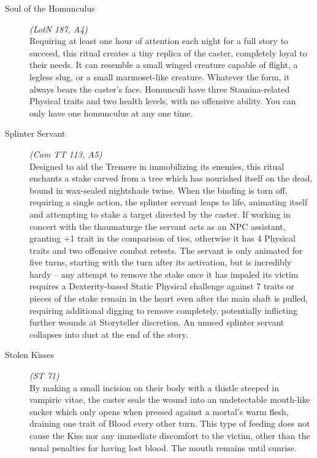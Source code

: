 \begin{description}
	\item[Soul of the Homunculus] \emph{(LotN 187, A4)} \hfill \\
	Requiring at least one hour of attention each night for a full story to succeed, this ritual creates a tiny replica of the caster, 
	completely loyal to their needs.  It can resemble a small winged creature capable of flight, a legless slug, or a small 
	marmoset-like creature.  Whatever the form, it always bears the caster's face.  Homunculi have three Stamina-related Physical 
	traits and two health levels, with no offensive ability.  You can only have one homunculus at any one time. \\

	\item[Splinter Servant] \emph{(Cam TT 113, A5)} \hfill \\
	Designed to aid the Tremere in immobilizing its enemies, this ritual enchants a stake carved from a tree which has nourished 
	itself on the dead, bound in wax-sealed nightshade twine.  When the binding is torn off, requiring a single action, the 
	splinter servant leaps to life, animating itself and attempting to stake a target directed by the caster.  If working in 
	concert with the thaumaturge the servant acts as an NPC assistant, granting +1 trait in the comparison of ties, otherwise it 
	has 4 Physical traits and two offensive combat retests.  The servant is only animated for five turns, starting with the turn 
	after its activation, but is incredibly hardy -- any attempt to remove the stake once it has impaled its victim requires a 
	Dexterity-based Static Physical challenge against 7 traits or pieces of the stake remain in the heart even after the main shaft 
	is pulled, requiring additional digging to remove completely, potentially inflicting further wounds at Storyteller discretion.  
	An unused splinter servant collapses into dust at the end of the story. \\

	\item[Stolen Kisses] \emph{(ST 71)} \hfill \\
	By making a small incision on their body with a thistle steeped in vampiric vitae, the caster seals the wound into an undetectable 
	mouth-like sucker which only opens when pressed against a mortal's warm flesh, draining one trait of Blood every other turn.  This 
	type of feeding does not cause the Kiss nor any immediate discomfort to the victim, other than the usual penalties for having lost 
	blood.  The mouth remains until sunrise. \\


\end{description}
